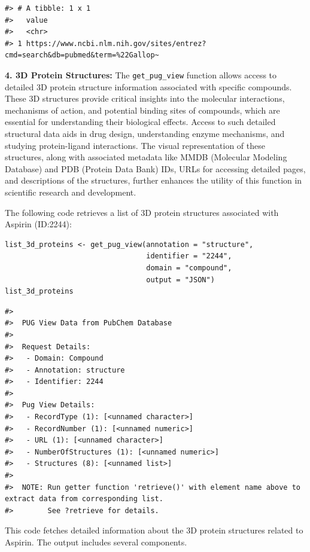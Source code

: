 \begin{verbatim}
#> # A tibble: 1 x 1
#>   value                                                                         
#>   <chr>                                                                         
#> 1 https://www.ncbi.nlm.nih.gov/sites/entrez?cmd=search&db=pubmed&term=%22Gallop~
\end{verbatim}

\textbf{4. 3D Protein Structures:} The \texttt{get\_pug\_view} function allows access to detailed 3D protein structure information associated with specific compounds. These 3D structures provide critical insights into the molecular interactions, mechanisms of action, and potential binding sites of compounds, which are essential for understanding their biological effects. Access to such detailed structural data aids in drug design, understanding enzyme mechanisms, and studying protein-ligand interactions. The visual representation of these structures, along with associated metadata like MMDB (Molecular Modeling Database) and PDB (Protein Data Bank) IDs, URLs for accessing detailed pages, and descriptions of the structures, further enhances the utility of this function in scientific research and development.

The following code retrieves a list of 3D protein structures associated with Aspirin (ID:2244):

\begin{verbatim}
list_3d_proteins <- get_pug_view(annotation = "structure", 
                                 identifier = "2244", 
                                 domain = "compound", 
                                 output = "JSON")
list_3d_proteins
\end{verbatim}

\begin{verbatim}
#> 
#>  PUG View Data from PubChem Database 
#> 
#>  Request Details:  
#>   - Domain: Compound
#>   - Annotation: structure
#>   - Identifier: 2244
#> 
#>  Pug View Details: 
#>   - RecordType (1): [<unnamed character>] 
#>   - RecordNumber (1): [<unnamed numeric>] 
#>   - URL (1): [<unnamed character>] 
#>   - NumberOfStructures (1): [<unnamed numeric>] 
#>   - Structures (8): [<unnamed list>] 
#> 
#>  NOTE: Run getter function 'retrieve()' with element name above to extract data from corresponding list. 
#>        See ?retrieve for details.
\end{verbatim}

This code fetches detailed information about the 3D protein structures related to Aspirin. The output includes several components.

